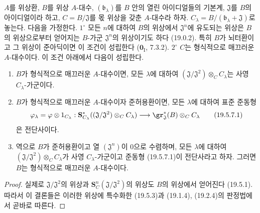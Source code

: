 \begin{corollary}[19.5.7]
\label{0.19.5.7-ko}
$A$를 위상환, $B$를 위상 $A$-대수,
$(\mathfrak b_\lambda)$를 $B$ 안의 열린 아이디얼들의 기본계,
$\mathfrak J$를 $B$의 아이디얼이라 하고, $C=B/\mathfrak J$를 몫 위상을
갖춘 $A$-대수라 하자. $C_\lambda=B/(\mathfrak b_\lambda+\mathfrak J)$로
놓는다. 다음을 가정한다. $1^\circ$ 모든 $n$에 대하여 $B$의 위상에서
$\mathfrak J^n$에 유도되는 위상은 $B$의 위상으로부터 얻어지는
$B$-가군 $\mathfrak J^n$의 위상이기도 하다 (19.0.2). 특히 $B$가
뇌터환이고 그 위상이 준아딕이면 이 조건이 성립한다
($\mathbf 0_{\mathrm I}$, 7.3.2). $2^\circ$ $C$는 형식적으로 매끄러운
$A$-대수이다. 이 조건 아래에서 다음이 성립한다.
\begin{enumerate}
  \item[\rm(i)] $B$가 형식적으로 매끄러운 $A$-대수이면, 모든
  $\lambda$에 대하여
  $(\mathfrak J/\mathfrak J^2)\otimes_C C_\lambda$는 사영
  $C_\lambda$-가군이다.
  \item[\rm(ii)] $B$가 형식적으로 매끄러운 $A$-대수이자 준허용환이면,
  모든 $\lambda$에 대하여 표준 준동형
  \begin{equation}
  \label{0.19.5.7.1-ko}
    \varphi_\lambda=\varphi\otimes 1_{C_\lambda}:
    \mathbf S_{C_\lambda}^*((\mathfrak J/\mathfrak J^2)\otimes_C C_\lambda)
    \longrightarrow\gr_{\mathfrak J}^*(B)\otimes_C C_\lambda
    \tag{19.5.7.1}
  \end{equation}
  은 전단사이다.


  \item[\rm(iii)] 역으로 $B$가 준허용환이고 열
  $(\mathfrak J^n)$이 $0$으로 수렴하며, 모든 $\lambda$에 대하여
  $(\mathfrak J/\mathfrak J^2)\otimes_C C_\lambda$가 사영
  $C_\lambda$-가군이고 준동형 (19.5.7.1)이 전단사라고 하자. 그러면
  $B$는 형식적으로 매끄러운 $A$-대수이다.
\end{enumerate}
\end{corollary}

\begin{proof}
실제로 $\mathfrak J/\mathfrak J^2$의 위상과
$\mathbf S_C^n(\mathfrak J/\mathfrak J^2)$의 위상도 $B$의 위상에서
얻어진다 (19.5.1). 따라서 이 결론들은 이러한 위상에 특수화한
(19.5.3)과 (19.1.4), (19.2.4)의 판정법에서 곧바로 따른다.
\end{proof}

